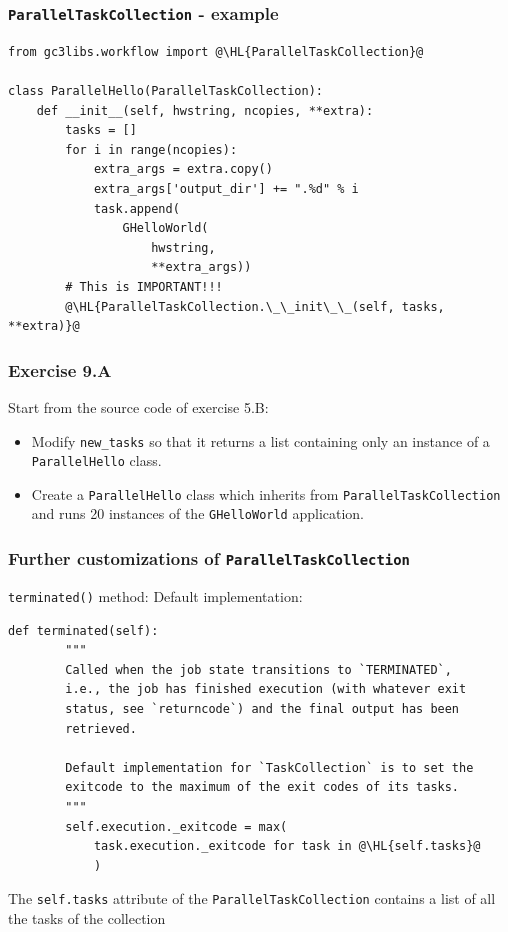\documentclass[english,serif,mathserif,xcolor=pdftex,dvipsnames,table]{beamer}
\begin{document}
\begin{frame}[fragile]
  \frametitle{\texttt{ParallelTaskCollection} - example}
  \begin{lstlisting}[basicstyle=\tt\scriptsize]
from gc3libs.workflow import @\HL{ParallelTaskCollection}@

class ParallelHello(ParallelTaskCollection):
    def __init__(self, hwstring, ncopies, **extra):
        tasks = []
        for i in range(ncopies):
            extra_args = extra.copy()
            extra_args['output_dir'] += ".%d" % i
            task.append(
                GHelloWorld(
                    hwstring,
                    **extra_args))
        # This is IMPORTANT!!!
        @\HL{ParallelTaskCollection.\_\_init\_\_(self, tasks, **extra)}@
  \end{lstlisting}
\end{frame}

\begin{frame}
  \frametitle{Exercise 9.A}

  Start from the source code of exercise 5.B:
  \begin{itemize}
  \item Modify \lstinline|new_tasks| so that it returns a list
    containing only an instance of a \lstinline|ParallelHello| class.
  \item Create a \lstinline|ParallelHello| class which inherits from
    \lstinline|ParallelTaskCollection| and runs 20 instances of the
    \lstinline|GHelloWorld| application.
  \end{itemize}
\end{frame}

\begin{frame}[fragile]
  \frametitle{Further customizations of
    \texttt{ParallelTaskCollection}}
  \texttt{terminated()} method: Default implementation:
  \+
  \begin{lstlisting}[basicstyle=\tt\scriptsize]
    def terminated(self):
        """
        Called when the job state transitions to `TERMINATED`, 
        i.e., the job has finished execution (with whatever exit 
        status, see `returncode`) and the final output has been 
        retrieved.

        Default implementation for `TaskCollection` is to set the
        exitcode to the maximum of the exit codes of its tasks.
        """
        self.execution._exitcode = max(
            task.execution._exitcode for task in @\HL{self.tasks}@
            )
          \end{lstlisting}
          The \lstinline|self.tasks| attribute of the
          \lstinline|ParallelTaskCollection| contains a list of all
          the tasks of the collection
\end{frame}
\end{document}
